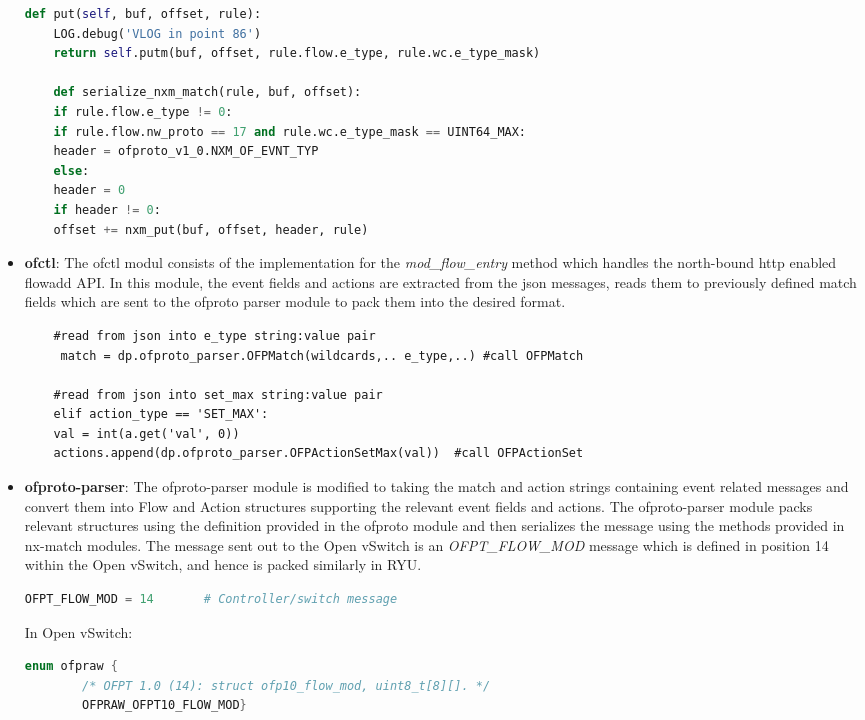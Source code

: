 \begin{itemize}
\begin{lstlisting}[language=python]
	def put(self, buf, offset, rule):
	LOG.debug('VLOG in point 86')
	return self.putm(buf, offset, rule.flow.e_type, rule.wc.e_type_mask)
	
	def serialize_nxm_match(rule, buf, offset):
	if rule.flow.e_type != 0:
	if rule.flow.nw_proto == 17 and rule.wc.e_type_mask == UINT64_MAX:
	header = ofproto_v1_0.NXM_OF_EVNT_TYP
	else:
	header = 0
	if header != 0: 
	offset += nxm_put(buf, offset, header, rule)
	\end{lstlisting}

	\item \textbf{ofctl}: The ofctl modul consists of the implementation for the \textit{mod_flow_entry} method which handles the north-bound http enabled flowadd API. In this module, the event fields and actions are extracted from the json messages, reads them to previously defined match fields which are sent to the ofproto parser module to pack them into the desired format. \newline
	\begin{lstlisting}
	#read from json into e_type string:value pair
	 match = dp.ofproto_parser.OFPMatch(wildcards,.. e_type,..) #call OFPMatch
	
	#read from json into set_max string:value pair
	elif action_type == 'SET_MAX':
	val = int(a.get('val', 0))
	actions.append(dp.ofproto_parser.OFPActionSetMax(val))  #call OFPActionSet
	\end{lstlisting}

	\item \textbf{ofproto-parser}: The ofproto-parser module is modified to taking the match and action strings containing event related messages and convert them into Flow and Action structures supporting the relevant event fields and actions. The ofproto-parser module packs relevant structures using the definition provided in the ofproto module and then serializes the message using the methods provided in nx-match modules. The message sent out to the Open vSwitch is an \textit{OFPT_FLOW_MOD} message which is defined in position 14 within the Open vSwitch, and hence is packed similarly in RYU. \newline
		\begin{lstlisting}[language=python]
		OFPT_FLOW_MOD = 14       # Controller/switch message
	    \end{lstlisting}
	    
	    In Open vSwitch:
	    \begin{lstlisting}[language=c]
		enum ofpraw {	
		/* OFPT 1.0 (14): struct ofp10_flow_mod, uint8_t[8][]. */
		OFPRAW_OFPT10_FLOW_MOD}
		\end{lstlisting}
		

\end{itemize}
